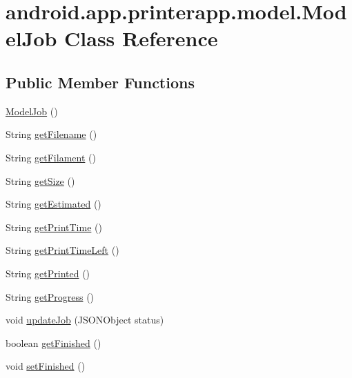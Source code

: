 \hypertarget{classandroid_1_1app_1_1printerapp_1_1model_1_1_model_job}{}\section{android.\+app.\+printerapp.\+model.\+Model\+Job Class Reference}
\label{classandroid_1_1app_1_1printerapp_1_1model_1_1_model_job}
\subsection*{Public Member Functions}
\begin{DoxyCompactItemize}
\item 
\hyperlink{classandroid_1_1app_1_1printerapp_1_1model_1_1_model_job_aa8c0dd4c621f50da0d968ecfb459866e}{Model\+Job} ()
\item 
String \hyperlink{classandroid_1_1app_1_1printerapp_1_1model_1_1_model_job_abceca92d943581bff0ce4311ceeb12e5}{get\+Filename} ()
\item 
String \hyperlink{classandroid_1_1app_1_1printerapp_1_1model_1_1_model_job_a58b14540639aba137ec44ee32291c3be}{get\+Filament} ()
\item 
String \hyperlink{classandroid_1_1app_1_1printerapp_1_1model_1_1_model_job_a74f87cebbb8ff6859c1b076a2079dd5f}{get\+Size} ()
\item 
String \hyperlink{classandroid_1_1app_1_1printerapp_1_1model_1_1_model_job_ac7840433e22811fbb5400efd6e2ecb85}{get\+Estimated} ()
\item 
String \hyperlink{classandroid_1_1app_1_1printerapp_1_1model_1_1_model_job_a04ca673a4fc8f2c35be11bb664f946e9}{get\+Print\+Time} ()
\item 
String \hyperlink{classandroid_1_1app_1_1printerapp_1_1model_1_1_model_job_ac820d757f74280f0aa7a41f360b7d13c}{get\+Print\+Time\+Left} ()
\item 
String \hyperlink{classandroid_1_1app_1_1printerapp_1_1model_1_1_model_job_a764e06b21fdb345d340e560eda261fd7}{get\+Printed} ()
\item 
String \hyperlink{classandroid_1_1app_1_1printerapp_1_1model_1_1_model_job_ad11ce4e259b3a2266f3b92169e4e4f38}{get\+Progress} ()
\item 
void \hyperlink{classandroid_1_1app_1_1printerapp_1_1model_1_1_model_job_a428beabe9954369e500df644ad220a6f}{update\+Job} (J\+S\+O\+N\+Object status)
\item 
boolean \hyperlink{classandroid_1_1app_1_1printerapp_1_1model_1_1_model_job_af1ba4d06738ba9608fba0a44ad67ce4b}{get\+Finished} ()
\item 
void \hyperlink{classandroid_1_1app_1_1printerapp_1_1model_1_1_model_job_a28cdf49fda55d0d24a1ce7282f6f85bf}{set\+Finished} ()
\end{DoxyCompactItemize}


